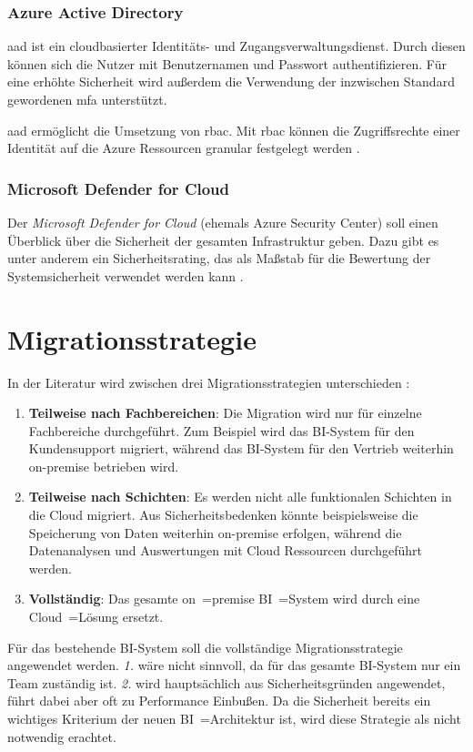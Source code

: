 \subsubsection{Azure Active Directory} \label{subsec:grundlagen:azure:sicherheitUndDatenschutz:aad}
\ac{aad} ist ein cloudbasierter Identitäts- und Zugangsverwaltungsdienst. Durch diesen können sich die Nutzer mit Benutzernamen und Passwort authentifizieren. Für eine erhöhte Sicherheit wird außerdem die Verwendung der inzwischen Standard gewordenen \ac{mfa} unterstützt.

\ac{aad} ermöglicht die Umsetzung von \ac{rbac}. Mit \ac{rbac} können die Zugriffsrechte einer Identität auf die Azure Ressourcen granular festgelegt werden \cite{stefanovic_azure_2021}.

\subsubsection{Microsoft Defender for Cloud} \label{subsec:grundlagen:azure:sicherheitUndDatenschutz:asc}
Der \textit{Microsoft Defender for Cloud} (ehemals Azure Security Center) soll einen Überblick über die Sicherheit der gesamten Infrastruktur geben. Dazu gibt es unter anderem ein Sicherheitsrating, das als Maßstab für die Bewertung der Systemsicherheit verwendet werden kann \cite{buchanan_azure_2022}.

\section{Migrationsstrategie} \label{sec:beschreibungMigrationsstrategie}
In der Literatur wird zwischen drei Migrationsstrategien unterschieden \cite{juan-verdejo_moving_2014}:
\begin{enumerate}
\item \textbf{Teilweise nach Fachbereichen}: Die Migration wird nur für einzelne Fachbereiche durchgeführt. Zum Beispiel wird das BI-System für den Kundensupport migriert, während das BI-System für den Vertrieb weiterhin on-premise betrieben wird.
\item \textbf{Teilweise nach Schichten}: Es werden nicht alle funktionalen Schichten in die Cloud migriert. Aus Sicherheitsbedenken könnte beispielsweise die Speicherung von Daten weiterhin on-premise erfolgen, während die Datenanalysen und Auswertungen mit Cloud Ressourcen durchgeführt werden.
\item \textbf{Vollständig}: Das gesamte on~=premise BI~=System wird durch eine Cloud~=Lösung ersetzt.
\end{enumerate}
Für das bestehende BI-System soll die vollständige Migrationsstrategie angewendet werden. \textit{1.} wäre nicht sinnvoll, da für das gesamte BI-System nur ein Team zuständig ist. \textit{2.} wird hauptsächlich aus Sicherheitsgründen angewendet, führt dabei aber oft zu Performance Einbußen. Da die Sicherheit bereits ein wichtiges Kriterium der neuen BI~=Architektur ist, wird diese Strategie als nicht notwendig erachtet.

